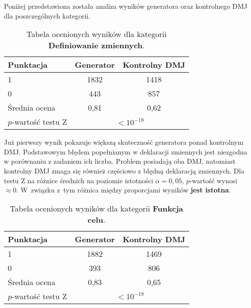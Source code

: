 Poniżej przedstawiona została analiza wyników generatora oraz kontrolnego DMJ dla poszczególnych kategorii.

\begin{table}[H]
\caption{Tabela ocenionych wyników dla kategorii \textbf{Definiowanie zmiennych}.}\label{tab:tabela12}
\centering%
\begin{tabular}{|l|c|c|}
\hline
\textbf{Punktacja} & \textbf{Generator} & \textbf{Kontrolny DMJ}\\
\hline
1 & 1832 & 1418 \\
\hline
0 & 443 & 857 \\
\hline
Średnia ocena & 0,81 & 0,62 \\
\hline
$p$-wartość testu Z&\multicolumn{2}{c|}{$<10^{-18}$}\\
\hline
\end{tabular}
\end{table}


Już pierwszy wynik pokazuje większą skuteczność generatora ponad kontrolnym DMJ. Podstawowym błędem popełnianym w deklaracji zmiennych jest niezgodna w porównaniu z zadaniem ich liczba. Problem posiadają oba DMJ, natomiast kontrolny DMJ zmaga się również częściowo z błędną deklaracją zmiennych. Dla testu Z na różnice średnich na poziomie istotności $\alpha = 0,05$, %
$p$-wartość wynosi $\approx 0$. W~związku z~tym różnica między proporcjami wyników \textbf{jest istotna}.


\begin{table}[H]
\caption{Tabela ocenionych wyników dla kategorii \textbf{Funkcja celu}.}\label{tab:tabela13}
\centering%
\begin{tabular}{|l|c|c|}
\hline
\textbf{Punktacja} & \textbf{Generator} & \textbf{Kontrolny DMJ}\\
\hline
1 & 1882 & 1469 \\
\hline
0 & 393 & 806 \\
\hline
Średnia ocena & 0,83 & 0,65 \\
\hline
$p$-wartość testu Z&\multicolumn{2}{c|}{$<10^{-18}$}\\
\hline
\end{tabular}
\end{table}


